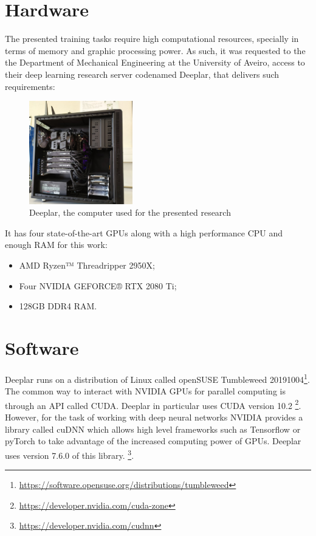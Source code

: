 \section{Hardware}
\label{section:hardware}
    The presented training tasks require high computational resources, specially in terms of memory and graphic processing power. As such, it was requested to the the Department of Mechanical Engineering at the University of Aveiro, access to their deep learning research server codenamed Deeplar, that delivers such requirements:
    
    \begin{figure}[ht]
        \centering
        \includegraphics[width=0.4\textwidth]{figs/deeplar.jpg}
        \caption{Deeplar, the computer used for the presented research}
        \label{fig:deeplar}
    \end{figure}
    
    It has four state-of-the-art \ac{GPU}s along with a high performance \ac{CPU} and enough \ac{RAM} for this work:
    
    \begin{itemize}
        \item AMD Ryzen™ Threadripper 2950X;
        \item Four NVIDIA GEFORCE® RTX 2080 Ti;
        \item 128GB DDR4 RAM.
    \end{itemize}

\section{Software}
\label{section:software}

    Deeplar runs on a distribution of Linux called openSUSE Tumbleweed 20191004\footnote{\url{https://software.opensuse.org/distributions/tumbleweed}}. The common way to interact with NVIDIA GPUs for parallel computing is through an API called CUDA. Deeplar in particular uses CUDA version 10.2 \footnote{\url{https://developer.nvidia.com/cuda-zone}}. However, for the task of working with deep neural networks NVIDIA provides a library called cuDNN which allows high level frameworks such as Tensorflow or pyTorch to take advantage of the increased computing power of GPUs. Deeplar uses version 7.6.0 of this library. \footnote{\url{https://developer.nvidia.com/cudnn}}.
    
